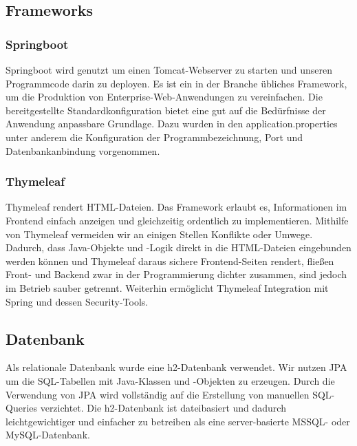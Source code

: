 \subsection{Frameworks}
%
\subsubsection*{Springboot}
Springboot wird genutzt um einen Tomcat-Webserver zu starten und unseren Programmcode darin zu deployen. Es ist ein in der Branche übliches Framework, um die Produktion von Enterprise-Web-Anwendungen zu vereinfachen. Die bereitgestellte Standardkonfiguration bietet eine gut auf die Bedürfnisse der Anwendung anpassbare Grundlage. Dazu wurden in den \glqq{}application.properties\grqq{} unter anderem die Konfiguration der Programmbezeichnung, Port und Datenbankanbindung vorgenommen.
\subsubsection*{Thymeleaf}
Thymeleaf rendert HTML-Dateien. Das Framework erlaubt es, Informationen im Frontend einfach anzeigen und gleichzeitig ordentlich zu implementieren. Mithilfe von Thymeleaf vermeiden wir an einigen Stellen Konflikte oder Umwege. Dadurch, dass Java-Objekte und -Logik direkt in die HTML-Dateien eingebunden werden können und Thymeleaf daraus sichere Frontend-Seiten rendert, fließen Front- und Backend zwar in der Programmierung dichter zusammen, sind jedoch im Betrieb sauber getrennt.
Weiterhin ermöglicht Thymeleaf Integration mit Spring und dessen Security-Tools.

\subsection{Datenbank}
Als relationale Datenbank wurde eine h2-Datenbank verwendet. Wir nutzen JPA um die SQL-Tabellen mit Java-Klassen und -Objekten zu erzeugen. Durch die Verwendung von JPA wird vollständig auf die Erstellung von manuellen SQL-Queries verzichtet. Die h2-Datenbank ist dateibasiert und dadurch leichtgewichtiger und einfacher zu betreiben als eine server-basierte MSSQL- oder MySQL-Datenbank.